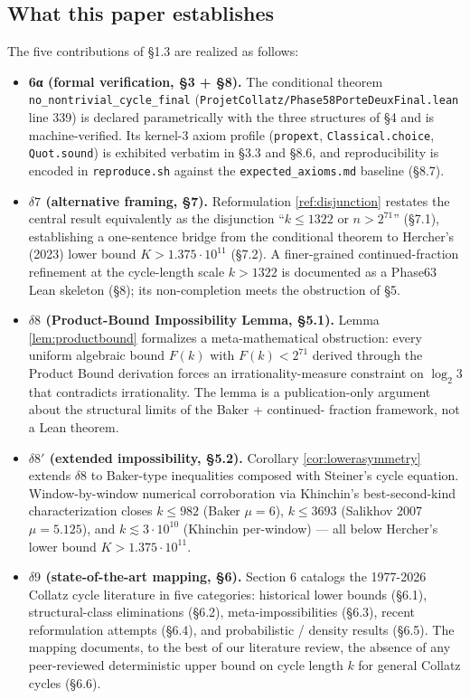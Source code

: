 \documentclass[
  11pt]{amsart}
\theoremstyle{plain}
\theoremstyle{definition}
\theoremstyle{remark}
\begin{document}
\subsection{What this paper
establishes}\label{what-this-paper-establishes}

The five contributions of §1.3 are realized as follows:

\begin{itemize}
\item
  \textbf{6α (formal verification, §3 + §8).} The conditional theorem
  \texttt{no\_nontrivial\_cycle\_final}
  (\texttt{ProjetCollatz/Phase58PorteDeuxFinal.lean} line 339) is
  declared parametrically with the three structures of §4 and is
  machine-verified. Its kernel-3 axiom profile (\texttt{propext},
  \texttt{Classical.choice}, \texttt{Quot.sound}) is exhibited verbatim
  in §3.3 and §8.6, and reproducibility is encoded in
  \texttt{reproduce.sh} against the \texttt{expected\_axioms.md}
  baseline (§8.7).
\item
  \textbf{\(\delta 7\) (alternative framing, §7).} Reformulation
  \ref{ref:disjunction} restates the central result equivalently as the
  disjunction ``\(k \leq 1322\) or \(n > 2^{71}\)'' (§7.1), establishing
  a one-sentence bridge from the conditional theorem to Hercher's (2023)
  lower bound \(K > 1.375 \cdot 10^{11}\) (§7.2). A finer-grained
  continued-fraction refinement at the cycle-length scale \(k > 1322\)
  is documented as a Phase63 Lean skeleton (§8); its non-completion
  meets the obstruction of §5.
\item
  \textbf{\(\delta 8\) (Product-Bound Impossibility Lemma, §5.1).} Lemma
  \ref{lem:productbound} formalizes a meta-mathematical obstruction:
  every uniform algebraic bound \(F(k)\) with \(F(k) < 2^{71}\) derived
  through the Product Bound derivation forces an irrationality-measure
  constraint on \(\log_2 3\) that contradicts irrationality. The lemma
  is a publication-only argument about the structural limits of the
  Baker + continued- fraction framework, not a Lean theorem.
\item
  \textbf{\(\delta 8'\) (extended impossibility, §5.2).} Corollary
  \ref{cor:lowerasymmetry} extends \(\delta 8\) to Baker-type
  inequalities composed with Steiner's cycle equation. Window-by-window
  numerical corroboration via Khinchin's best-second-kind
  characterization closes \(k \leq 982\) (Baker \(\mu = 6\)),
  \(k \leq 3693\) (Salikhov 2007 \(\mu = 5.125\)), and
  \(k \lesssim 3 \cdot 10^{10}\) (Khinchin per-window) --- all below
  Hercher's lower bound \(K > 1.375 \cdot 10^{11}\).
\item
  \textbf{\(\delta 9\) (state-of-the-art mapping, §6).} Section 6
  catalogs the 1977-2026 Collatz cycle literature in five categories:
  historical lower bounds (§6.1), structural-class eliminations (§6.2),
  meta-impossibilities (§6.3), recent reformulation attempts (§6.4), and
  probabilistic / density results (§6.5). The mapping documents, to the
  best of our literature review, the absence of any peer-reviewed
  deterministic upper bound on cycle length \(k\) for general Collatz
  cycles (§6.6).
\end{itemize}
\end{document}
